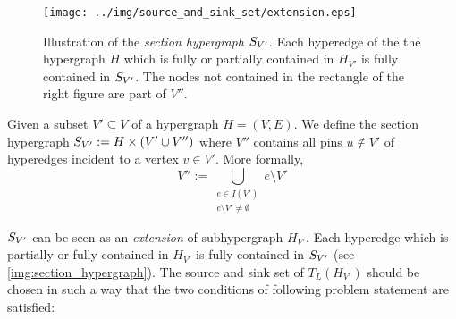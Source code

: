 \begin{figure}
\centering
\texttt{[image: ../img/source\_and\_sink\_set/extension.eps]}
\caption{Illustration of the \emph{section hypergraph} $S_{V'}$. Each hyperedge of the
         the hypergraph $H$ which is fully or partially contained in $H_{V'}$ is fully
         contained in $S_{V'}$. The nodes not contained in the rectangle of the right figure
         are part of $V''$.}
\label{img:section_hypergraph}
\end{figure}

\begin{definition}
\label{def:sub_extension}
Given a subset $V' \subseteq V$ of a hypergraph $H = (V,E)$.
We define the section hypergraph $S_{V'} := H \times (V' \cup V'')$
where $V''$ contains all pins $u \notin V'$ of hyperedges incident to a vertex 
$v \in V'$. More formally, 
\[V'' := \bigcup_{\substack{e \in I(V') \\ e \setminus V' \neq \emptyset}} e \setminus V'\]
\end{definition}

$S_{V'}$ can be seen as an \emph{extension} of subhypergraph $H_{V'}$. Each
hyperedge which is partially or fully contained in $H_{V'}$ is fully contained in $S_{V'}$
(see \autoref{img:section_hypergraph}). The source and sink set of $T_L(H_{V'})$ should be
chosen in such a way that the two conditions of following problem statement are satisfied:

